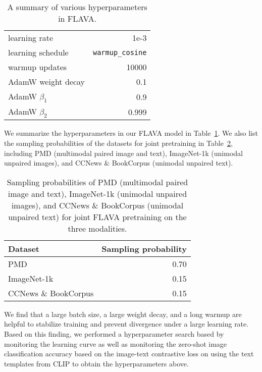 \documentclass[10pt,twocolumn,letterpaper]{article}
\begin{document}
\begin{table}[b]
\begin{center}
\begin{tabular}{@{}lr@{}}
learning rate & 1e-3 \\
learning schedule & \texttt{warmup\_cosine} \\
warmup updates & 10000\\
AdamW weight decay & 0.1 \\ 
AdamW $\beta_1$ & 0.9 \\
AdamW $\beta_2$ & 0.999 \\
\bottomrule
\end{tabular}
\end{center}
\vspace{-1.5em}
\caption{A summary of various hyperparameters in FLAVA.}
\label{tab:supp_hyper-parameters}
\end{table}

We summarize the hyperparameters in our FLAVA model in Table~\ref{tab:supp_hyper-parameters}. We also list the sampling probabilities of the datasets for joint pretraining in Table~\ref{tab:supp_sampling_ratio}, including PMD (multimodal paired image and text), ImageNet-1k (unimodal unpaired images), and CCNews \& BookCorpus (unimodal unpaired text).

\begin{table}[t]
\small
\begin{center}
\begin{tabular}{@{}l@{}r@{}}
\toprule
\textbf{Dataset} & \textbf{Sampling probability}
\\
\midrule
PMD & 0.70 \\
ImageNet-1k & 0.15 \\
CCNews \& BookCorpus & 0.15 \\
\bottomrule
\end{tabular}
\end{center}
\vspace{-1.5em}
\caption{Sampling probabilities of PMD (multimodal paired image and text), ImageNet-1k (unimodal unpaired images), and CCNews \& BookCorpus (unimodal unpaired text) for joint FLAVA pretraining on the three modalities.}
\label{tab:supp_sampling_ratio}
\vspace{-1em}
\end{table}

We find that a large batch size, a large weight decay, and a long warmup are helpful to stabilize training and prevent divergence under a large learning rate. Based on this finding, we performed a hyperparameter search based by monitoring the learning curve as well as monitoring the zero-shot image classification accuracy based on the image-text contrastive loss on using the text templates from CLIP \cite{radford2021learning} to obtain the hyperparameters above.
\end{document}
